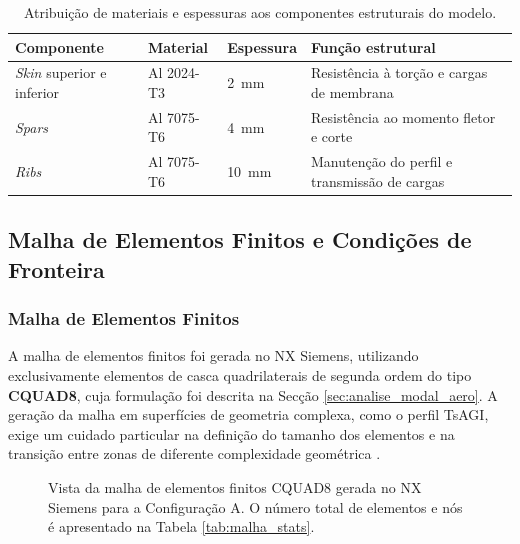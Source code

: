 \documentclass[a4paper,fleqn]{cas-sc}
\begin{document}
\begin{table}
\centering
\caption{Atribuição de materiais e espessuras aos componentes 
estruturais do modelo.}
\label{tab:material_componentes}
\renewcommand{\arraystretch}{1.4}
\begin{tabularx}{\textwidth}{p{3.5cm} p{3cm} p{2cm} X}
\toprule
\textbf{Componente} & \textbf{Material} & 
\textbf{Espessura} & \textbf{Função estrutural} \\
\midrule
\textit{Skin} superior e inferior & Al 2024-T3 & 
    \SI{2}{\milli\meter} & 
    Resistência à torção e cargas de membrana \\
\textit{Spars} & Al 7075-T6 & 
    \SI{4}{\milli\meter}\footnotemark & 
    Resistência ao momento fletor e corte \\
\textit{Ribs} & Al 7075-T6 & 
    \SI{10}{\milli\meter} & 
    Manutenção do perfil e transmissão de cargas \\
\bottomrule
\end{tabularx}
\end{table}

\subsection{Malha de Elementos Finitos e Condições de Fronteira}

\subsubsection{Malha de Elementos Finitos}

A malha de elementos finitos foi gerada no NX Siemens, utilizando exclusivamente elementos de casca quadrilaterais de segunda ordem do tipo \textbf{CQUAD8}, cuja formulação foi descrita na Secção \ref{sec:analise_modal_aero}. A geração da malha em superfícies de geometria complexa, como o perfil TsAGI, exige um cuidado particular na definição do tamanho dos elementos e na transição entre zonas de diferente complexidade geométrica \cite{Bathe2014}.

\begin{figure}
    \centering
    \caption{Vista da malha de elementos finitos CQUAD8 gerada 
    no NX Siemens para a Configuração A. O número total de 
    elementos e nós é apresentado na Tabela 
    \ref{tab:malha_stats}.}
    \label{fig:malha_nx}
\end{figure}
\end{document}
